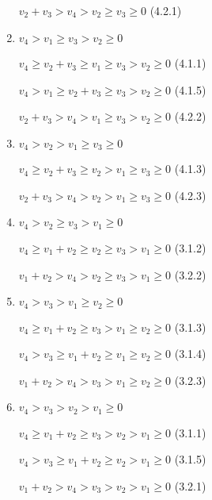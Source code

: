 \documentclass{article}
\begin{document}
\begin{enumerate}
    $v_2+v_3>v_4>v_2\geq{v_3}\geq{0}$ (4.2.1)

    \item $v_4>v_1\geq{v_3}>v_2\geq{0}$

    $v_4\geq{v_2+v_3}\geq{v_1}\geq{v_3}>v_2\geq{0}$ (4.1.1)

    $v_4>v_1\geq{v_2+v_3}\geq{v_3}>v_2\geq{0}$ (4.1.5)

    $v_2+v_3>v_4>v_1\geq{v_3}>v_2\geq{0}$ (4.2.2)

    \item $v_4>v_2>v_1\geq{v_3}\geq{0}$

    $v_4\geq{v_2+v_3}\geq{v_2}>v_1\geq{v_3}\geq{0}$ (4.1.3)

    $v_2+v_3>v_4>v_2>v_1\geq{v_3}\geq{0}$ (4.2.3)

    \item $v_4>v_2\geq{v_3}>v_1\geq{0}$

    $v_4\geq{v_1+v_2}\geq{v_2}\geq{v_3}>v_1\geq{0}$ (3.1.2)

    $v_1+v_2>v_4>v_2\geq{v_3}>v_1\geq{0}$ (3.2.2)

    \item $v_4>v_3>v_1\geq{v_2}\geq{0}$

    $v_4\geq{v_1+v_2}\geq{v_3}>v_1\geq{v_2}\geq{0}$ (3.1.3)

    $v_4>v_3\geq{v_1+v_2}\geq{v_1}\geq{v_2}\geq{0}$ (3.1.4)

    $v_1+v_2>v_4>v_3>v_1\geq{v_2}\geq{0}$ (3.2.3)

    \item $v_4>v_3>v_2>v_1\geq{0}$

    $v_4\geq{v_1+v_2}\geq{v_3}>v_2>v_1\geq{0}$ (3.1.1)

    $v_4>v_3\geq{v_1+v_2}\geq{v_2}>v_1\geq{0}$ (3.1.5)

    $v_1+v_2>v_4>v_3>v_2>v_1\geq{0}$ (3.2.1)






    
    
\end{enumerate}
\end{document}
